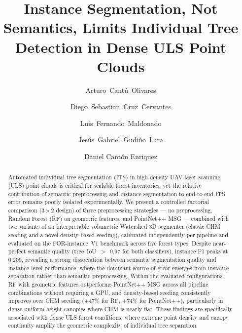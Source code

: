 \documentclass[runningheads]{llncs}
\begin{document}
\title{Instance Segmentation, Not Semantics, Limits Individual Tree Detection in Dense ULS Point Clouds}

\author{Arturo~Cant\'u~Olivares \and
Diego~Sebastian~Cruz~Cervantes \and
Luis~Fernando~Maldonado \and
Jes\'us~Gabriel~Gudi\~no~Lara \and
Daniel Cantón Enriquez}



\maketitle

\begin{abstract}
Automated individual tree segmentation (ITS) in high-density UAV laser scanning (ULS) point clouds is critical for scalable forest inventories, yet the relative contribution of semantic preprocessing and instance segmentation to end-to-end ITS error remains poorly isolated experimentally. We present a controlled factorial comparison ($3 \times 2$ design) of three preprocessing strategies --- no preprocessing, Random Forest (RF) on geometric features, and PointNet++ MSG --- combined with two variants of an interpretable volumetric Watershed 3D segmenter (classic CHM seeding and a novel density-based seeding), calibrated independently per pipeline and evaluated on the FOR-instance~V1 benchmark across five forest types. Despite near-perfect semantic quality (tree~IoU~$>$~0.97 for both classifiers), instance F1 peaks at 0.209, revealing a strong dissociation between semantic segmentation quality and instance-level performance, where the dominant source of error emerges from instance separation rather than semantic preprocessing. Within the evaluated configurations, RF with geometric features outperforms PointNet++ MSG across all pipeline combinations without requiring a GPU, and density-based seeding consistently improves over CHM seeding (+47\% for RF, +74\% for PointNet++), particularly in dense uniform-height canopies where CHM is nearly flat. These findings are specifically associated with dense ULS forest conditions, where extreme point density and canopy continuity amplify the geometric complexity of individual tree separation.

\end{abstract}
\newpage
\end{document}
